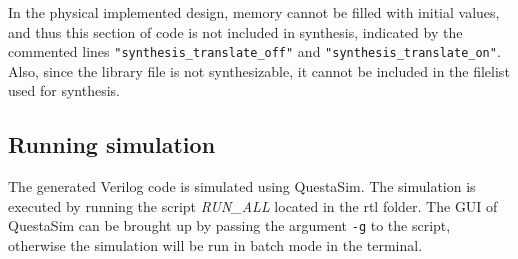 In the physical implemented design, memory cannot be filled with initial values, and thus this section of code is not included in synthesis, indicated by the commented lines \verb!"synthesis_translate_off"! and \verb!"synthesis_translate_on"!. Also, since the library file is not synthesizable, it cannot be included in the filelist used for synthesis.

\subsection{Running simulation}
The generated Verilog code is simulated using QuestaSim. The simulation is executed by running the script \textit{RUN\_ALL} located in the rtl folder. The GUI of QuestaSim can be brought up by passing the argument \verb!-g! to the script, otherwise the simulation will be run in batch mode in the terminal.

